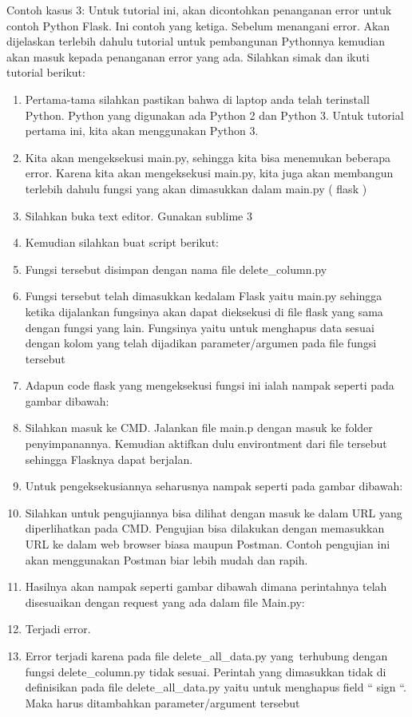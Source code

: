 Contoh kasus 3: Untuk tutorial ini, akan dicontohkan penanganan error untuk contoh Python Flask. Ini contoh yang ketiga. Sebelum menangani error. Akan dijelaskan terlebih dahulu tutorial untuk pembangunan Pythonnya kemudian akan masuk kepada penanganan error yang ada. Silahkan simak dan ikuti tutorial berikut:
\begin{enumerate}
\item Pertama-tama silahkan pastikan bahwa di laptop anda telah terinstall Python. Python yang digunakan ada Python 2 dan Python 3. Untuk tutorial pertama ini, kita akan menggunakan Python 3.
\item Kita akan mengeksekusi main.py, sehingga kita bisa menemukan beberapa error. Karena kita akan mengeksekusi main.py, kita juga akan membangun terlebih dahulu fungsi yang akan dimasukkan dalam main.py ( flask )
\item Silahkan buka text editor. Gunakan sublime 3
\item Kemudian silahkan buat script berikut:
\item Fungsi tersebut disimpan dengan nama file delete\_column.py
\item Fungsi tersebut telah dimasukkan kedalam Flask yaitu main.py sehingga ketika dijalankan fungsinya akan dapat dieksekusi di file flask yang sama dengan fungsi yang lain. Fungsinya yaitu untuk menghapus data sesuai dengan kolom yang telah dijadikan parameter/argumen pada file fungsi tersebut
\item Adapun code flask yang mengeksekusi fungsi ini ialah nampak seperti pada gambar dibawah:
\item Silahkan masuk ke CMD. Jalankan file main.p dengan masuk ke folder penyimpanannya. Kemudian aktifkan dulu environtment dari file tersebut sehingga Flasknya dapat berjalan.
\item Untuk pengeksekusiannya seharusnya nampak seperti pada gambar dibawah: 
\item Silahkan untuk pengujiannya bisa dilihat dengan masuk ke dalam URL yang diperlihatkan pada CMD. Pengujian bisa dilakukan dengan memasukkan URL ke dalam web browser biasa maupun Postman. Contoh pengujian ini akan menggunakan Postman biar lebih mudah dan rapih.
\item Hasilnya akan nampak seperti gambar dibawah dimana perintahnya telah disesuaikan dengan request yang ada dalam file Main.py: 
\item Terjadi error.
\item Error terjadi karena pada file delete\_all\_data.py yang\ terhubung dengan fungsi delete\_column.py tidak sesuai. Perintah yang dimasukkan tidak di definisikan pada file delete\_all\_data.py yaitu untuk menghapus field “ sign “. Maka harus ditambahkan parameter/argument tersebut

\end{enumerate}

